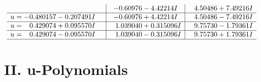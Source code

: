 \documentclass[1p]{elsarticle_modified}
\theoremstyle{definition}
\begin{document}
$$\begin{array}{c|c|c}
 & -0.60976 - 4.42214 I & \phantom{-}4.50486 + 7.49216 I \\ \hline\begin{aligned}
u &= -0.480157 - 0.207491 I\end{aligned}
 & -0.60976 + 4.42214 I & \phantom{-}4.50486 - 7.49216 I \\ \hline\begin{aligned}
u &= \phantom{-}0.429074 + 0.095570 I\end{aligned}
 & \phantom{-}1.039040 + 0.315096 I & \phantom{-}9.75730 - 1.79361 I \\ \hline\begin{aligned}
u &= \phantom{-}0.429074 - 0.095570 I\end{aligned}
 & \phantom{-}1.039040 - 0.315096 I & \phantom{-}9.75730 + 1.79361 I\\
 \hline 
 \end{array}$$\newpage
\newpage\renewcommand{\arraystretch}{1}
\centering \section*{ II. u-Polynomials}
\end{document}
